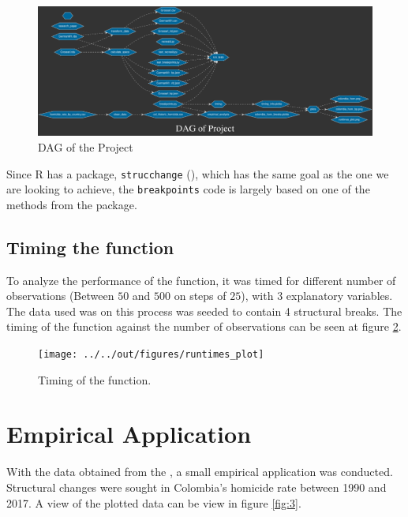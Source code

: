 \documentclass[11pt, a4paper, leqno]{article}
\begin{document}
\begin{figure}[h]

    \includegraphics[width=\textwidth]{../../static/figures/dag}
    \caption{DAG of the Project}
    \label{fig:1}

\end{figure}

Since R has a package, \texttt{strucchange} (\citealt{zeileis2019strucchange}), which has the same goal as the one we are looking to achieve, the \texttt{breakpoints} code is largely based on one of the methods from the package.

\subsection{Timing the function}

To analyze the performance of the function, it was timed for different number of observations (Between $50$ and $500$ on steps of $25$), with $3$ explanatory variables.  The data used was on this process was seeded to contain 4 structural breaks. The timing of the function against the number of observations can be seen at figure \ref{fig:2}.

\begin{figure}[h]

    \texttt{[image: ../../out/figures/runtimes\_plot]}
    \caption{Timing of the function.}
    \label{fig:2}

\end{figure}


\section{Empirical Application}
\label{sec:empirical}

With the data obtained from the \cite{world2017homicides}, a small empirical application was conducted. Structural changes were sought in Colombia's homicide rate between 1990 and 2017. A view of the plotted data can be view in figure \ref{fig:3}.
\end{document}
